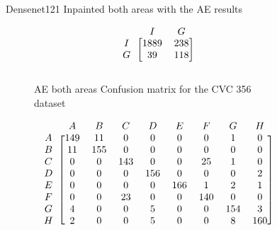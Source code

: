 \begin{figure}
\caption{Densenet121 Inpainted both areas with the AE results}
\myfontsize
\caption*{\footnotesize \textmd{ \textbf{A}:{dyed-lifted-polyps} , \textbf{B}:{dyed-resection-margins} , \textbf{C}:{esophagitis} , \textbf{D}:{normal-cecum} , \textbf{E}:{normal-pylorus} , \textbf{F}:{normal-z-line} , \textbf{G}:{polyps} , \textbf{H}:{ulcerative-colitis} , \textbf{I}:{non-polyp}}}

\begin{subfigure}[b]{0.25\textwidth}
     
\[
\begin{blockarray}{ccc}
& I & G  \\
\begin{block}{c[cc]}
        I&1889 & 238\\
        G&  39 & 118\\
\end{block}
\end{blockarray}
 \]         

\caption{AE both areas Confusion matrix for the CVC 356 dataset}
\label{mat:cvc356_CM_DN121_AE_BOTH}
\end{subfigure}
\begin{subfigure}[b]{0.49\textwidth}  
\scriptsize     
\[
\begin{blockarray}{ccccccccc}
& A & B & C & D & E & F & G & H \\
\begin{block}{c[cccccccc]}
A&149 & 11 & 0 & 0 & 0 & 0 & 1 & 0\\
B& 11 & 155 & 0 & 0 & 0 & 0 & 0 & 0\\
C&  0 & 0 & 143 & 0 & 0 & 25 & 1 & 0\\
D&  0 & 0 & 0 & 156 & 0 & 0 & 0 & 2\\
E&  0 & 0 & 0 & 0 & 166 & 1 & 2 & 1\\
F&  0 & 0 & 23 & 0 & 0 & 140 & 0 & 0\\
G&  4 & 0 & 0 & 5 & 0 & 0 & 154 & 3\\
H&  2 & 0 & 0 & 5 & 0 & 0 & 8 & 160\\
\end{block}
\end{blockarray}
 \]        
        

\end{subfigure}
\end{figure}
